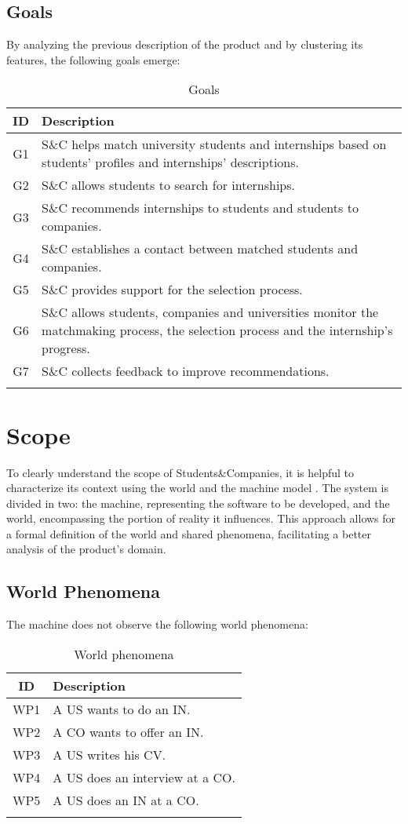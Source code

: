 \subsection{Goals}
By analyzing the previous description of the product and by clustering its features, the following goals emerge:

\renewcommand{\arraystretch}{1.5}
\begin{longtable}{|c|p{12.5cm}|}
    \hline \rowcolor{polimiblue!40}
    \textbf{ID} & \textbf{Description} \\ \hline
    G1 & S\&C helps match university students and internships based on students' profiles and internships' descriptions. \\ \hline
    G2 & S\&C allows students to search for internships. \\ \hline
    G3 & S\&C recommends internships to students and students to companies. \\ \hline
    G4 & S\&C establishes a contact between matched students and companies. \\ \hline
    G5 & S\&C provides support for the selection process. \\ \hline
    G6 & S\&C allows students, companies and universities monitor the matchmaking process, the selection process and the internship's progress. \\ \hline
    G7 & S\&C collects feedback to improve recommendations. \\ \hline
\caption{Goals}
\end{longtable}

\section{Scope}
To clearly understand the scope of Students\&Companies, it is helpful to characterize its context using the world and the machine model \cite{jackson1995}.
The system is divided in two: the machine, representing the software to be developed, and the world, encompassing the portion of reality it influences.
This approach allows for a formal definition of the world and shared phenomena, facilitating a better analysis of the product's domain.

\subsection{World Phenomena}
The machine does not observe the following world phenomena:

\renewcommand{\arraystretch}{1.5}
\begin{longtable}{|c|p{10.5cm}|}
    \hline \rowcolor{polimiblue!40}
    \textbf{ID} & \textbf{Description} \\ \hline
    WP1 & A US wants to do an IN. \\ \hline
    WP2 & A CO wants to offer an IN. \\ \hline
    WP3 & A US writes his CV. \\ \hline
    WP4 & A US does an interview at a CO. \\ \hline
    WP5 & A US does an IN at a CO. \\ \hline
\caption{World phenomena}
\end{longtable}

